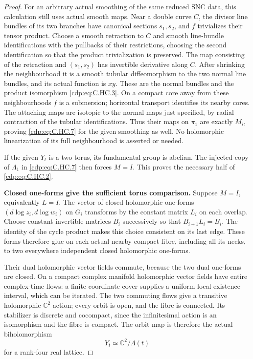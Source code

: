 \begin{proof}
For an arbitrary actual smoothing of the same
reduced SNC data, this calculation still uses
actual smooth maps. Near a double curve $C$,
the divisor line bundles of its two branches
have canonical sections $s_1,s_2$, and $f$
trivializes their tensor product. Choose a
smooth retraction to $C$ and smooth line-bundle
identifications with the pullbacks of their
restrictions, choosing the second identification
so that the product trivialization is preserved.
The map consisting of the retraction and
$(s_1,s_2)$ has invertible derivative along $C$.
After shrinking the neighbourhood it is a
smooth tubular diffeomorphism to the two
normal line bundles, and its actual function
is $xy$. These are the normal bundles and
the product isomorphism \eqref{cdp:eq:C.HC.3}.
On a compact core away from these neighbourhoods
$f$ is a submersion; horizontal transport
identifies its nearby cores. The attaching
maps are isotopic to the normal maps just
specified, by radial contraction of the
tubular identifications. Thus their maps on
$\pi_1$ are exactly $M_i$, proving \eqref{cdp:eq:C.HC.7}
for the given smoothing as well. No holomorphic
linearization of its full neighbourhood is
asserted or needed.

If the given $Y_t$ is a two-torus, its fundamental
group is abelian. The injected copy of $\Lambda_1$
in \eqref{cdp:eq:C.HC.7} then forces $M=I$.
This proves the necessary half of \eqref{cdp:eq:C.HC.2}.

\par\medskip\noindent\textbf{Closed one-forms give the sufficient torus comparison.}
Suppose $M=I$, equivalently $L=I$.
The vector of closed holomorphic one-forms
$(d\log z_i,d\log w_i)$ on $G_i$ transforms
by the constant matrix $L_i$ on each overlap.
Choose constant invertible matrices $B_i$
successively so that $B_{i+1}L_i=B_i$.
The identity of the cycle product makes this
choice consistent on its last edge.
These forms therefore glue on each actual
nearby compact fibre, including all its necks,
to two everywhere independent closed holomorphic
one-forms.

Their dual holomorphic vector fields commute,
because the two dual one-forms are closed.
On a compact complex manifold holomorphic
vector fields have entire complex-time flows:
a finite coordinate cover supplies a uniform
local existence interval, which can be iterated.
The two commuting flows give a transitive
holomorphic $\mathbb C^2$-action; every orbit
is open, and the fibre is connected.
Its stabilizer is discrete and cocompact,
since the infinitesimal action is an
isomorphism and the fibre is compact.
The orbit map is therefore the actual
biholomorphism
\[
                  Y_t\simeq\mathbb C^2/\Lambda(t)
\tag{C.HC.8}\label{cdp:eq:C.HC.8}
\]
for a rank-four real lattice.


\end{proof}
